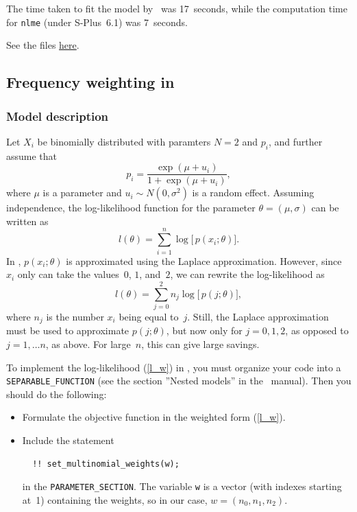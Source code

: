 \documentclass{admbmanual}
\begin{document}
The time taken to fit the model by \scAR\ was 17~seconds, while the
computation time for \texttt{nlme} (under S-Plus~6.1) was 7~seconds.

See the files \href{http://otter-rsch.com/admbre/examples/pheno/pheno.html}{here}.

\subsection{Frequency weighting in \scAR}
\label{seq:frequency_example}

\subsubsection{Model description}

Let $X_{i}$ be binomially distributed with paramters $N=2$ and $p_{i}$, and
further assume that
\begin{equation}
p_{i}=\frac{\exp (\mu +u_{i})}{1+\exp (\mu +u_{i})},
\end{equation}%
where $\mu $ is a parameter and $u_{i}\sim N(0,\sigma ^{2})$ is a random
effect. Assuming independence, the log-likelihood function for the parameter $\theta =(\mu ,\sigma )$ can be written as
\begin{equation}
l(\theta )=\sum_{i=1}^{n}\log \bigl[\, p(x_{i};\theta )\bigr] .
\end{equation}%
In \scAR, $p(x_{i};\theta )$ is approximated using the Laplace
approximation. However, since $x_{i}$ only can take the values~$0$, $1$, and~$2$, we can rewrite the log-likelihood as 
\begin{equation}
l(\theta )=\sum_{j=0}^{2}n_{j}\log \bigl[\, p(j;\theta )\bigr] ,  \label{l_w}
\end{equation}%
where $n_{j}$ is the number $x_{i}$ being equal to~$j$. Still, the Laplace
approximation must be used to approximate $p(j;\theta )$, but now only for $j=0,1,2$, as opposed to $j = 1,\dots n$, as above. For large~$n$, this can give large
savings.

To implement the log-likelihood (\ref{l_w}) in \scAR, you must organize your
code into a \texttt{SEPARABLE\_FUNCTION} (see the section ''Nested models'' in the
\scAR\ manual). Then you should do the following:
\begin{itemize}
\item Formulate the objective function in the weighted form (\ref{l_w}).

\item Include the statement
  \begin{lstlisting}
  !! set_multinomial_weights(w);
  \end{lstlisting}
in the
\texttt{PARAMETER\_SECTION}.  The variable \texttt{w} is a vector (with indexes starting at~1)
containing the weights, so in our case, $w=(n_{0},n_{1},n_{2})$.
\end{itemize}
\end{document}
